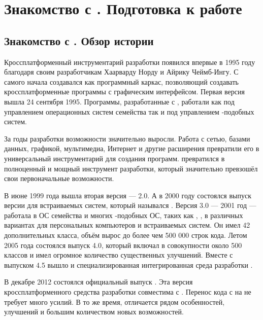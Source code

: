 
\chapter{Знакомство с . Подготовка к работе}
\section[Знакомство с \Sys{Qt}. Обзор истории]{Знакомство с . Обзор истории}
Кроссплатформенный инструментарий разработки  появился впервые в 1995 году благодаря своим разработчикам
Хаарварду Норду и Айрику Чеймб-Ингу. С самого начала создавался как программный каркас, позволяющий 
создавать кроссплатформенные программы с графическим интерфейсом. Первая версия  вышла 
24 сентября 1995. Программы, разработанные с , работали как под управлением операционных 
систем семейства  так и под управлением -подобных систем.

За годы разработки возможности  значительно выросли. Работа с сетью, базами данных, графикой,
мультимедиа, Интернет и другие расширения превратили его в универсальный инструментарий для создания программ. 
 превратился в полноценный и мощный инструмент разработки, который значительно превзошёл свои первоначальные
возможности.

В июне 1999 года вышла вторая версия ---  2.0. А в 2000 году состоялся выпуск версии для встраиваемых
систем, который назывался . Версия  3.0 --- 2001 год --- работала в ОС семейства 
 и многих -подобных ОС, таких как , , в различных 
вариантах  для персональных компьютеров и встраиваемых
систем. Он имел 42 дополнительных класса, объём вырос до более чем 500 000 строк кода. Летом 2005 года состоялся выпуск
 4.0, который включал в совокупности около 500 классов и имел огромное количество существенных улучшений. Вместе с
выпуском  4.5 вышло и специализированная интегрированная
среда разработки .

В декабре 2012 состоялся официальный выпуск . Эта версия кроссплатформенного средства разработки
совместима с . Перенос кода с  на  не требует много усилий. В то же время, 
 отличается рядом особенностей,
улучшений и большим количеством новых возможностей.

